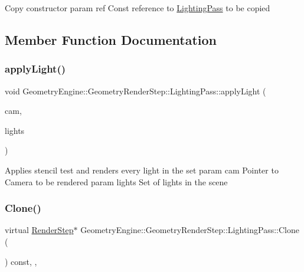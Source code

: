 Copy constructor param ref Const reference to \mbox{\hyperlink{class_geometry_engine_1_1_geometry_render_step_1_1_lighting_pass}{Lighting\+Pass}} to be copied 

\subsection{Member Function Documentation}
\mbox{\label{class_geometry_engine_1_1_geometry_render_step_1_1_lighting_pass_a9d0a0f3b9d52036b9d4f9fbee353cd10}} 
\subsubsection{\texorpdfstring{applyLight()}{applyLight()}}
{\footnotesize\ttfamily void Geometry\+Engine\+::\+Geometry\+Render\+Step\+::\+Lighting\+Pass\+::apply\+Light (\begin{DoxyParamCaption}\item[{\mbox{\hyperlink{class_geometry_engine_1_1_geometry_world_item_1_1_geometry_camera_1_1_camera}{Geometry\+World\+Item\+::\+Geometry\+Camera\+::\+Camera}} $\ast$}]{cam,  }\item[{std\+::unordered\+\_\+set$<$ \mbox{\hyperlink{class_geometry_engine_1_1_geometry_world_item_1_1_geometry_light_1_1_light}{Geometry\+World\+Item\+::\+Geometry\+Light\+::\+Light}} $\ast$ $>$ $\ast$}]{lights }\end{DoxyParamCaption})\hspace{0.3cm}{\ttfamily [protected]}}

Applies stencil test and renders every light in the set param cam Pointer to Camera to be rendered param lights Set of lights in the scene \mbox{\label{class_geometry_engine_1_1_geometry_render_step_1_1_lighting_pass_a4f1cb36c7bf6a90d0aa3b8e8feba5e5e}} 
\subsubsection{\texorpdfstring{Clone()}{Clone()}}
{\footnotesize\ttfamily virtual \mbox{\hyperlink{class_geometry_engine_1_1_geometry_render_step_1_1_render_step}{Render\+Step}}$\ast$ Geometry\+Engine\+::\+Geometry\+Render\+Step\+::\+Lighting\+Pass\+::\+Clone (\begin{DoxyParamCaption}{ }\end{DoxyParamCaption}) const\hspace{0.3cm}{\ttfamily [inline]}, {\ttfamily [override]}, {\ttfamily [virtual]}}

